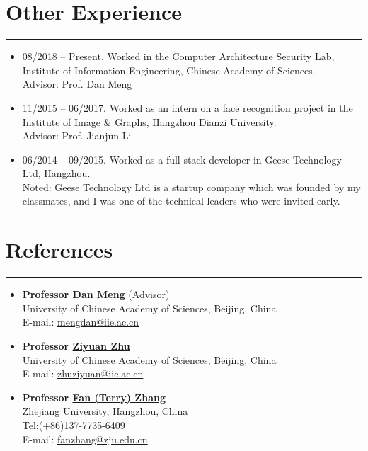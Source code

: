\documentclass[11pt]{article}
\begin{document}
\section*{Other Experience}
\vspace{-0.6cm}
\rule[0.1pt]{\textwidth}{1pt}
\begin{itemize}

\item 08/2018 -- Present. Worked in the Computer Architecture Security Lab, Institute of Information Engineering, Chinese Academy of Sciences. \\
Advisor: Prof. Dan Meng

\item 11/2015 -- 06/2017. Worked as an intern on a face recognition project in the Institute of Image \& Graphs, Hangzhou Dianzi University. \\
 Advisor: Prof. Jianjun Li
 
\item 06/2014 -- 09/2015. Worked as a full stack developer in Geese Technology Ltd, Hangzhou. \\
 Noted: Geese Technology Ltd is a startup company which was founded by my classmates, and I was one of the technical leaders who were invited early.
\end{itemize}



\section*{References}
\vspace{-0.6cm}
\rule[0.1pt]{\textwidth}{1pt}
\begin{itemize}
\item {\bf Professor \href{http://people.ucas.ac.cn/~md}{Dan Meng}} (Advisor)\\
University of Chinese Academy of Sciences, Beijing, China  \\
E-mail: \href{mailto:mengdan@iie.ac.cn}{mengdan@iie.ac.cn}\\

\item {\bf Professor \href{http://people.ucas.edu.cn/~0039297}{Ziyuan Zhu}}\\
University of Chinese Academy of Sciences, Beijing, China  \\
E-mail: \href{mailto:zhuziyuan@iie.ac.cn}{zhuziyuan@iie.ac.cn}\\

\item {\bf Professor \href{https://person.zju.edu.cn/fanzhang}{Fan (Terry) Zhang}}\\
Zhejiang University, Hangzhou, China  \\
Tel:(+86)137-7735-6409 \\
E-mail: \href{mailto:fanzhang@zju.edu.cn}{fanzhang@zju.edu.cn}\\

\end{itemize}
\end{document}
